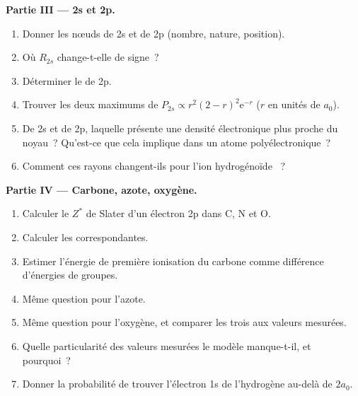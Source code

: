 \begin{problem}
\medskip
\noindent\textbf{Partie III --- 2s et 2p.}
\begin{enumerate}[resume]
  \item Donner les nœuds de 2s et de 2p (nombre, nature, position).
  \item Où $R_{2s}$ change-t-elle de signe~?
  \item Déterminer le  de 2p.
  \item Trouver les deux maximums de $P_{2s} \propto r^2(2 - r)^2\mathrm e^{-r}$ ($r$ en unités de
        $a_0$).
  \item De 2s et de 2p, laquelle présente une densité électronique plus proche du noyau~? Qu'est-ce
        que cela implique dans un atome polyélectronique~?
  \item Comment ces rayons changent-ils pour l'ion hydrogénoïde ~?
\end{enumerate}

\medskip
\noindent\textbf{Partie IV --- Carbone, azote, oxygène.}
\begin{enumerate}[resume]
  \item Calculer le $Z^*$ de Slater d'un électron 2p dans C, N et O.
  \item Calculer les  correspondantes.
  \item Estimer l'énergie de première ionisation du carbone comme différence d'énergies
        de groupes.
  \item Même question pour l'azote.
  \item Même question pour l'oxygène, et comparer les trois aux valeurs mesurées.
  \item Quelle particularité des valeurs mesurées le modèle manque-t-il, et pourquoi~?
  \item Donner la probabilité de trouver l'électron 1s de l'hydrogène au-delà
        de $2a_0$.
\end{enumerate}
\end{problem}
